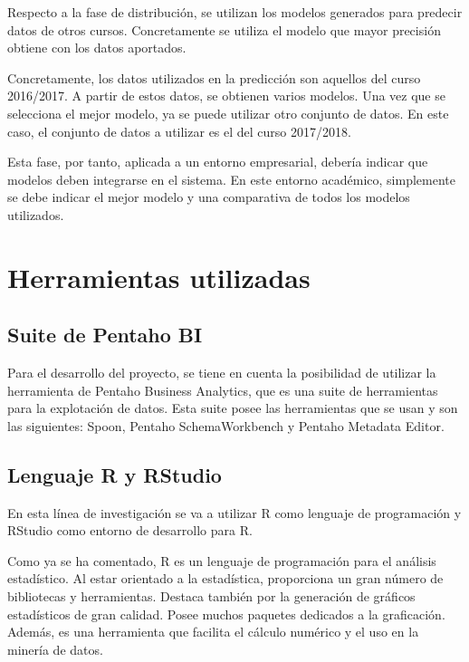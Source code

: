 Respecto a la fase de distribución, se utilizan los modelos generados para predecir datos de otros cursos. Concretamente se utiliza el modelo que mayor precisión obtiene con los datos aportados.

Concretamente, los datos utilizados en la predicción son aquellos del curso 2016/2017. A partir de estos datos, se obtienen varios modelos. Una vez que se selecciona el mejor modelo, ya se puede utilizar otro conjunto de datos. En este caso, el conjunto de datos a utilizar es el del curso 2017/2018.

Esta fase, por tanto, aplicada a un entorno empresarial, debería indicar que modelos deben integrarse en el sistema. En este entorno académico, simplemente se debe indicar el mejor modelo y una comparativa de todos los modelos utilizados.





\section{Herramientas utilizadas}
\subsection{Suite de Pentaho BI}
Para el desarrollo del proyecto, se tiene en cuenta la posibilidad de utilizar la herramienta de Pentaho Business Analytics, que es una suite de herramientas para la explotación de datos. Esta suite posee las herramientas que se usan y son las siguientes: Spoon, Pentaho SchemaWorkbench y Pentaho Metadata Editor.

\subsection{Lenguaje R y RStudio}
En esta línea de investigación se va a utilizar R como lenguaje de programación y RStudio como entorno de desarrollo para R.

Como ya se ha comentado, R es un lenguaje de programación para el análisis estadístico. Al estar orientado a la estadística, proporciona un gran número de bibliotecas y herramientas. Destaca también por la generación de gráficos estadísticos de gran calidad. Posee muchos paquetes dedicados a la graficación. Además, es una herramienta que facilita el cálculo numérico y el uso en la minería de datos. \cite{emanuel2014}

